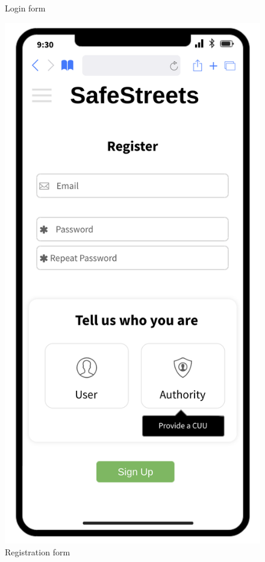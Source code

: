 \begin{figure}[H]
\begin{minipage}[b]{0.40\textwidth}
			\caption{Login form}
		\end{minipage}
		\hfill
		\begin{minipage}[b]{0.4\textwidth}
			\includegraphics[width=\textwidth]{Images/registration.png}
			\caption{Registration form}
		\end{minipage}
	\end{figure}
	
